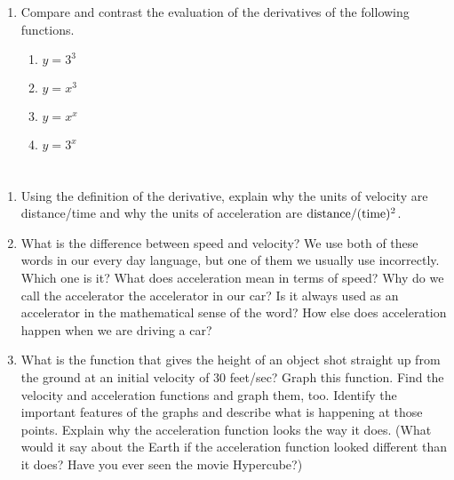 \section{}
\begin{enumerate}%

\item  Compare and contrast the evaluation of the derivatives of the following functions.
\begin{enumerate}

\item  $y = 3^3$ 

\item   $y = x^3$ 

\item  $y = x^x$ 

\item   $y = 3^x$\end{enumerate}

\end{enumerate}
\section{}
\begin{enumerate}%

\item  Using the definition of the derivative, explain why the units of velocity are distance/time and why the units of acceleration are ${\rm{distance}}/({\rm{time}})^2$.

\item  What is the difference between speed and velocity?  We use both of these words in our every day language, but one of them we usually use incorrectly.  Which one is it?  What does acceleration mean in terms of speed?  Why do we call the accelerator the accelerator in our car?  Is it always used as an accelerator in the mathematical sense of the word?  How else does acceleration happen when we are driving a car?

\item  What is the function that gives the height of an object shot straight up from the ground at an initial velocity of 30 feet/sec?  Graph this function.  Find the  velocity and acceleration functions and graph them, too.  Identify the important features of the graphs and describe what is happening at those points.  Explain why the acceleration function looks the way it does.  (What would it say about the Earth if the acceleration function looked different than it does?  Have you ever seen the movie Hypercube?)


\end{enumerate}
